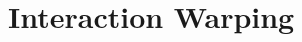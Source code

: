 \documentclass{article}
\DeclareMathOperator*{\argmin}{arg\,min}
\newcommand{\pcx}[1]{\mathrm{pcd}^{(#1)}}
\newcommand{\wxy}[2]{W_{#1 \rightarrow #2}}
\newcommand{\pci}{\pcx{i}}
\newcommand{\pcj}{\pcx{j}}
\newcommand{\pcc}{\pcx{C}}
\newcommand{\wij}{\wxy{i}{j}}
\newcommand{\wci}{\wxy{C}{i}}
\begin{document}



\section{Interaction Warping}
\end{document}
